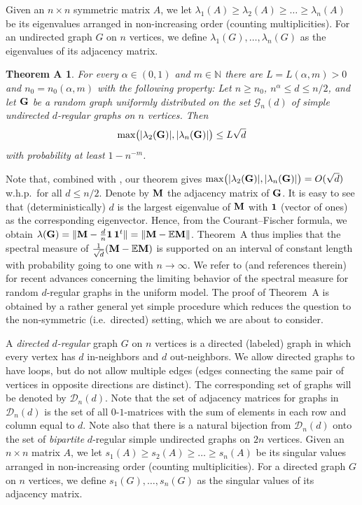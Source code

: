 \documentclass[12pt]{article}
\newtheorem*{theoremA*}{Theorem A}
\theoremstyle{definition}
\theoremstyle{plain}
\newcommand{\N}{\mathbb{N}}
\newcommand{\E}{\mathbb{E}}
\def\nrangr{G}
\def\rangr{{\bf{}G}}
\def\ranmtx{{\bf{}M}}
\def\DGraphSet{{\mathcal D}_n}
\def\UGraphSet{{\mathcal G}_{n}}
\begin{document}
Given an $n\times n$ symmetric matrix $A$, we let
$\lambda_1(A)\geq\lambda_2(A)\geq\ldots\geq \lambda_n(A)$ be its
eigenvalues arranged in non-increasing order (counting multiplicities).
For an undirected graph $\nrangr$ on $n$ vertices, we define $\lambda_1(\nrangr),\ldots,\lambda_n(\nrangr)$
as the eigenvalues of its adjacency matrix.
\begin{theoremA*}
For every $\alpha\in(0,1)$ and $m\in\N$ there are $L=L(\alpha,m)>0$ and $n_0=n_0(\alpha,m)$ with the following property:
Let $n\geq n_0$, $n^\alpha\leq d\leq n/2$, and let $\rangr$ be a random graph uniformly distributed on
the set $\UGraphSet(d)$ of simple undirected $d$-regular graphs on $n$ vertices. Then
$$\max\bigl(|\lambda_2(\rangr)|,|\lambda_n(\rangr)|\bigr)\leq L\sqrt{d}$$
with probability at least $1-n^{-m}$.
\end{theoremA*}

Note that, combined with \cite{BFSU,CGJ}, our theorem gives
$\max\bigl(|\lambda_2(\rangr)|,|\lambda_n(\rangr)|\bigr)=O( \sqrt{d})$
w.h.p.\ for all $d\leq n/2$. Denote by $\ranmtx$ the adjacency matrix of $\rangr$. It is easy to see that (deterministically) 
$d$ is the largest eigenvalue of $\ranmtx$ with ${\bf 1}$ (vector of ones) as the corresponding eigenvector. Hence,  
from the Courant--Fischer formula, we obtain $\lambda(\rangr)=\Vert \ranmtx-  \frac{d}{n}{\bf 1}\,{\bf 1}^t\Vert=
\Vert \ranmtx-  \E\ranmtx\Vert$. Theorem~A thus implies 
that the spectral measure of $\frac{1}{\sqrt{d}} (\ranmtx-\E\ranmtx)$ is supported on an interval of constant
length with probability going to one with $n\to\infty$. 
We refer to \cite{BKY,BHKY} (and references therein) for recent advances concerning the limiting behavior of the spectral measure 
for random $d$-regular graphs in the uniform model. 
The proof of Theorem~A is obtained by a rather general
yet simple procedure which reduces the question to the non-symmetric (i.e.\ directed) setting,
which we are about to consider. 

\bigskip

A {\it directed $d$-regular} graph $\nrangr$ on $n$ vertices is a directed (labeled) graph in which every vertex has $d$
in-neighbors and $d$ out-neighbors. We allow directed graphs to have loops, but do not allow multiple edges
(edges connecting the same pair of vertices in opposite directions are distinct).
The corresponding set of graphs will be denoted by $\DGraphSet(d)$.
Note that the set of adjacency matrices for graphs in $\DGraphSet(d)$
is the set of all $0\text{-}1$-matrices with the sum of elements in each row and column equal to $d$.
Note also that there is
a natural bijection from $\DGraphSet(d)$ onto the set of {\it bipartite}
$d$-regular simple undirected graphs on $2n$ vertices. 
Given an $n\times n$ matrix $A$, we let
$s_1(A)\geq s_2(A)\geq\ldots\geq s_n(A)$ be its
singular values arranged in non-increasing order (counting multiplicities).
For a directed graph $\nrangr$ on $n$ vertices, we define $s_1(\nrangr),\ldots,s_n(\nrangr)$
as the singular values of its adjacency matrix.
\end{document}

